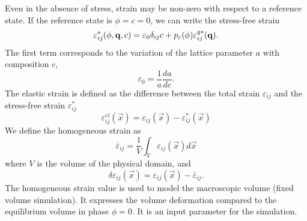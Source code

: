 Even in the absence of stress, strain may be non-zero with respect to
a reference state.  If the reference state is $\phi=c=0$, we can write
the stress-free strain
%
\begin{equation}\label{eq:stress_free_strain}
  \varepsilon_{ij}^*(\phi,{\bf q},c)
  =\varepsilon_0 \delta_{ij} c
  +p_\varepsilon(\phi) \varepsilon_{ij}^{q*}({\bf q}).
\end{equation}
%
The first term corresponds to the variation of the lattice parameter
$a$ with composition $c$,
%
\begin{equation}\label{eq:epsilon0}
  \varepsilon_0=\frac{1}{a}\frac{da}{dc}.
\end{equation}
%
The elastic strain is defined as the difference between the total strain 
$\varepsilon_{ij}$ and the stress-free strain $\varepsilon_{ij}^*$
%
\begin{equation}\label{eq:elstrain}
  \varepsilon_{ij}^{el}(\vec x)
  =\varepsilon_{ij}(\vec x)-\varepsilon_{ij}^*(\vec x)
\end{equation}
%
We define the homogeneous strain as
%
\begin{equation}\label{eq:homstrain}
  \bar\varepsilon_{ij}=\frac{1}{V}\int_{V}\varepsilon_{ij}(\vec x)d\vec x
\end{equation}
%
where $V$ is the volume of the physical domain,
and
%
\begin{equation}\label{eq:depsilon}
  \delta\varepsilon_{ij}(\vec x)
  =\varepsilon_{ij}(\vec x)-\bar\varepsilon_{ij}.
\end{equation}
%
The homogeneous strain value is used to model the macroscopic volume
(fixed volume simulation).
It expresses the volume deformation compared to the equilibrium volume
in phase $\phi=0$.
It is an input parameter for the
simulation.

